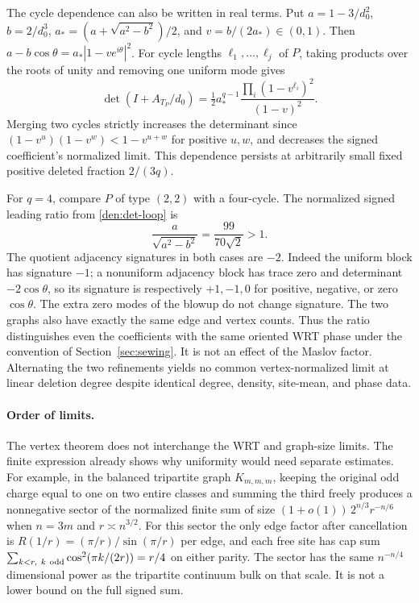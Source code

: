 The cycle dependence can also be written in real terms. Put \(a=1-3/d_0^2\), \(b=2/d_0^3\), \(a_*=(a+\sqrt{a^2-b^2})/2\), and \(v=b/(2a_*)\in(0,1)\). Then \(a-b\cos\theta=a_*|1-v e^{i\theta}|^2\). For cycle lengths \(\ell_1,\ldots,\ell_j\) of \(P\), taking products over the roots of unity and removing one uniform mode gives
\[
 \det(I+A_{T_P}/d_0)=
        \tfrac12 a_*^{q-1}\frac{\prod_i(1-v^{\ell_i})^2}{(1-v)^2}.
\]
Merging two cycles strictly increases the determinant since
\((1-v^u)(1-v^w)<1-v^{u+w}\) for positive \(u,w\), and decreases the signed coefficient's normalized limit. This dependence persists at arbitrarily small fixed positive deleted fraction \(2/(3q)\).

For \(q=4\), compare \(P\) of type \((2,2)\) with a four-cycle. The normalized signed leading ratio from \eqref{den:det-loop} is
\[
 \frac{a}{\sqrt{a^2-b^2}}=\frac{99}{70\sqrt2}>1 .
\]
The quotient adjacency signatures in both cases are \(-2\). Indeed the uniform block has signature \(-1\); a nonuniform adjacency block has trace zero and determinant \(-2\cos\theta\), so its signature is respectively \(+1,-1,0\) for positive, negative, or zero \(\cos\theta\). The extra zero modes of the blowup do not change signature. The two graphs also have exactly the same edge and vertex counts. Thus the ratio distinguishes even the coefficients with the same oriented WRT phase under the convention of Section~\ref{sec:sewing}. It is not an effect of the Maslov factor. Alternating the two refinements yields no common vertex-normalized limit at linear deletion degree despite identical degree, density, site-mean, and phase data.

\paragraph{Order of limits.}
The vertex theorem does not interchange the WRT and graph-size limits. The finite expression already shows why uniformity would need separate estimates. For example, in the balanced tripartite graph \(K_{m,m,m}\), keeping the original odd charge equal to one on two entire classes and summing the third freely produces a nonnegative sector of the normalized finite sum of size
\((1+o(1))\,2^{n/3}r^{-n/6}\) when \(n=3m\) and \(r\asymp n^{3/2}\). For this sector the only edge factor after cancellation is \(R(1/r)= (\pi/r)/\sin(\pi/r)\) per edge, and each free site has cap sum \(\sum_{k<r,\ k\ {\rm odd}}\cos^2(\pi k/(2r))=r/4\) on either parity. The sector has the same \(n^{-n/4}\) dimensional power as the tripartite continuum bulk on that scale. It is not a lower bound on the full signed sum.

